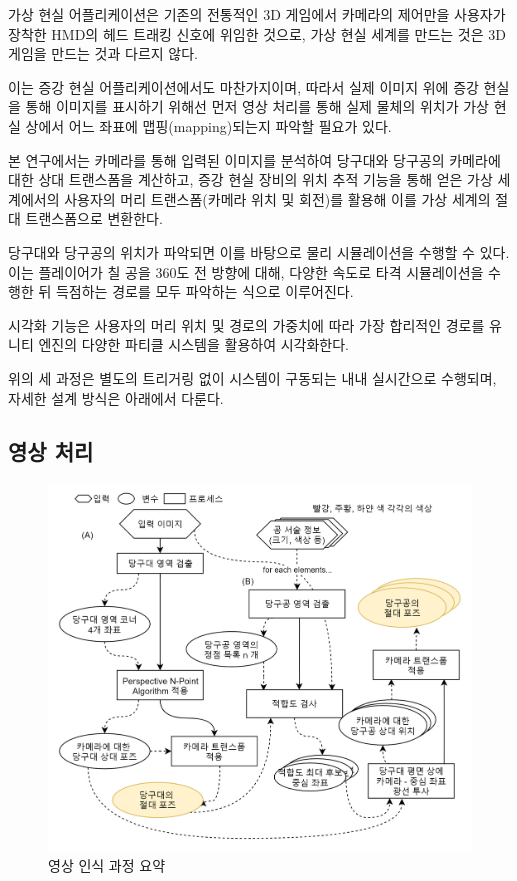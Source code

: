 \documentclass[10pt]{oblivoir}
\begin{document}
가상 현실 어플리케이션은 기존의 전통적인 3D 게임에서 카메라의 제어만을 사용자가 장착한 HMD의 헤드 트래킹 신호에 위임한 것으로, 가상 현실 세계를 만드는 것은 3D 게임을 만드는 것과 다르지 않다.

이는 증강 현실 어플리케이션에서도 마찬가지이며, 따라서 실제 이미지 위에 증강 현실을 통해 이미지를 표시하기 위해선 먼저 영상 처리를 통해 실제 물체의 위치가 가상 현실 상에서 어느 좌표에 맵핑(mapping)되는지 파악할 필요가 있다.

본 연구에서는 카메라를 통해 입력된 이미지를 분석하여 당구대와 당구공의 카메라에 대한 상대 트랜스폼을 계산하고, 증강 현실 장비의 위치 추적 기능을 통해 얻은 가상 세계에서의 사용자의 머리 트랜스폼(카메라 위치 및 회전)를 활용해 이를 가상 세계의 절대 트랜스폼으로 변환한다.

당구대와 당구공의 위치가 파악되면 이를 바탕으로 물리 시뮬레이션을 수행할 수 있다. 이는 플레이어가 칠 공을 360도 전 방향에 대해, 다양한 속도로 타격 시뮬레이션을 수행한 뒤 득점하는 경로를 모두 파악하는 식으로 이루어진다.

시각화 기능은 사용자의 머리 위치 및 경로의 가중치에 따라 가장 합리적인 경로를 유니티 엔진의 다양한 파티클 시스템을 활용하여 시각화한다.

위의 세 과정은 별도의 트리거링 없이 시스템이 구동되는 내내 실시간으로 수행되며, 자세한 설계 방식은 아래에서 다룬다.

\subsection{영상 처리}
\begin{figure}
    \centering
    \includegraphics[width=16cm]{img/recognition-diagram.png}
    \caption{영상 인식 과정 요약}
    \label{fig;recognition-flowchart}
\end{figure}
\end{document}
